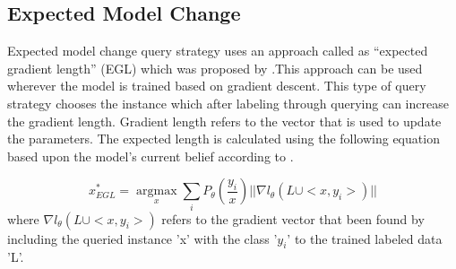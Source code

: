 \subsection{Expected Model Change}
Expected model change query strategy uses an approach called as “expected
gradient length” (EGL) which was proposed by \cite{settles2008multiple}.This approach can be used wherever the model is trained based on gradient descent. This type of query strategy chooses the instance which after labeling through querying can increase the gradient length. Gradient length refers to the vector that is used to update the parameters. The expected length is calculated using the following equation based upon the model’s current belief according to \cite{Settles2010}.

\begin{equation}  
x^*_{EGL} = \operatorname*{argmax}_x \sum_{i} P_{\theta}(\frac{y_i}{x})||\nabla l_{\theta}(L \cup <x,y_i>)||
\end{equation} 
where $\nabla l_{\theta}(L \cup <x,y_i>)$  refers to the gradient vector that been found by including the queried instance 'x' with the class '$y_i$' to the trained labeled data 'L'. \cite{Settles2010}

